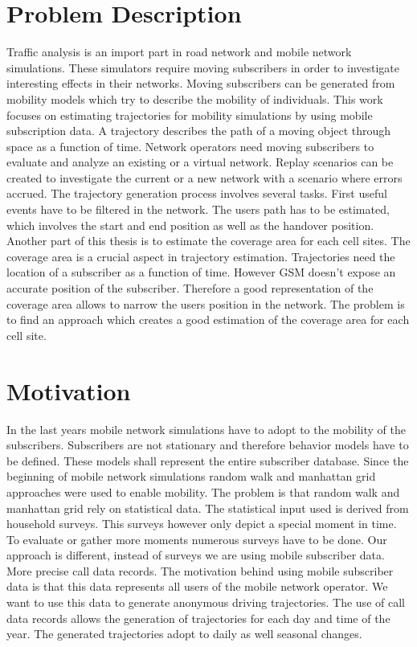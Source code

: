 \documentclass[master,english]{hgbthesis}
\begin{document}
\section{Problem Description}
Traffic analysis is an import part in road network and mobile network simulations. These simulators require moving subscribers in order to investigate interesting effects in their networks. Moving subscribers can be generated from mobility models which try to describe the mobility of individuals.
This work focuses on estimating trajectories for mobility simulations by using mobile subscription data. A trajectory describes the path of a moving object through space as a function of time. Network operators need moving subscribers to evaluate and analyze an existing or a virtual network. Replay scenarios can be created to investigate the current or a new network  with a scenario where errors accrued. The trajectory generation process involves several tasks. First useful events have to be filtered in the network. The users path has to be estimated, which involves the start and end position as well as the handover position. 
Another part of this thesis is to estimate the coverage area for each cell sites. The coverage area is a crucial aspect in trajectory estimation. Trajectories need the location of a subscriber as a function of time. However GSM doesn't expose an accurate position of the subscriber. Therefore a good representation of the coverage area allows to narrow the users position in the network. The problem is to find an approach which creates a good estimation of the coverage area for each cell site.
\section{Motivation}
In the last years mobile network simulations have to adopt to the mobility of the subscribers. Subscribers are not stationary and therefore behavior models have to be defined. These models shall represent the entire subscriber database. 
Since the beginning of mobile network simulations random walk and manhattan grid approaches were used to enable mobility. The problem is that random walk and manhattan grid rely on statistical data. The statistical input used is derived from household surveys. This surveys however only depict a special moment in time. To evaluate or gather more moments numerous surveys have to be done. 
Our approach is different, instead of surveys we are using mobile subscriber data. More precise call data records. The motivation behind using mobile subscriber data is that this data represents all users of the mobile network operator. We want to use this data to generate anonymous driving trajectories. The use of call data records allows the generation of trajectories for each day and time of the year. The generated trajectories adopt to daily as well seasonal changes.
\end{document}
